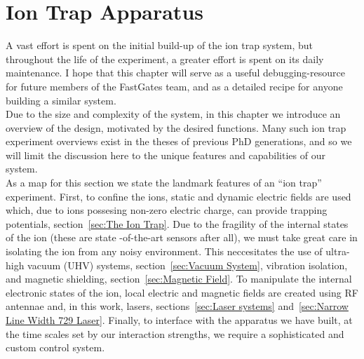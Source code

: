 \chapter{Ion Trap Apparatus}
\minitoc

    A vast effort is spent on the initial build-up of the ion trap system, but
    throughout the life of the experiment, a greater effort is spent on its daily
    maintenance.  I hope that this chapter will serve as a useful debugging-resource for future
    members of the FastGates team, and as a detailed recipe for anyone
    building a similar system. \\

    Due to the size and complexity of the system, in this chapter we introduce an overview of
    the design, motivated by the desired functions.  
    Many such  ion trap experiment overviews exist in the theses of previous PhD
    generations, and so we will limit the discussion here to the unique features
    and capabilities of our system.\\
    As a map for this section we state the landmark features of an ``ion trap''
    experiment. First, to confine the ions, static and dynamic electric fields
    are used which, due to ions possesing non-zero electric charge, can provide
    trapping potentials, section~\ref{sec:The Ion Trap}. Due to the fragility of
    the internal states of the ion (these are state -of-the-art sensors after
    all), we must take great care in isolating the ion from any noisy
    environment. This neccesitates the use of ultra-high vacuum (UHV) systems,
    section~\ref{sec:Vacuum System}, vibration isolation, and magnetic
    shielding, section~\ref{sec:Magnetic Field}. To manipulate the internal
    electronic states of the ion, local electric and magnetic fields
    are created using RF antennae and, in this work, lasers, sections~\ref{sec:Laser
    systems} and~\ref{sec:Narrow Line Width 729 Laser}.  Finally, to interface
    with the apparatus we have built, at the time scales set by our interaction
    strengths, we require a sophisticated and custom control system.



